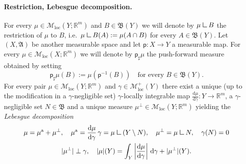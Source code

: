 \documentclass[11pt,reqno]{amsart}
\numberwithin{equation}{section}
\newcommand{\R}{\mathbb{R}}
\newcommand{\dd}{\mathrm{d}}
\theoremstyle{definition}
\def\dd{\mathrm{d}}
\newcommand{\sfp}{\mathsf{p}}
\newcommand{\mres}{\kern1pt\mathbin{\vrule height 1.6ex depth 0pt width
    0.13ex\vrule height 0.13ex depth 0pt width 1.3ex}}
\newcommand{\frB}{\mathfrak B}
\newcommand{\Mloc}{\mathcal{M}_{\mathrm{loc}}}
\numberwithin{equation}{section}
\begin{document}
 \paragraph{\bf Restriction, Lebesgue decomposition.} For every $\mu\in \Mloc(Y;\R^m)$ and $B\in \frB(Y)$
 we will denote by $\mu\mres B$ the restriction of $\mu$ to $B$, i.e.\ 
 $\mu\mres B(A):=\mu(A\cap B)$ for every $A\in \frB(Y)$.
 Let $(X,\mathfrak A)$ be another measurable space and let $\sfp:X\to
 Y$
 a measurable map. 
 For every $\mu\in \Mloc(X;\R^m)$ we will denote by
 $\sfp_\sharp\mu$ the push-forward measure obtained by setting
 \begin{equation}
   \label{eq:82}
   \sfp_\sharp\mu(B):=\mu(\sfp^{-1}(B))\quad\text{for every }B\in \frB(Y).
 \end{equation}
 For every pair $\mu\in \Mloc(Y;\R^m)$ and $\gamma\in \Mloc^+(Y)$
 there exist a unique (up to the modification
 in a $\gamma$-negligible set) $\gamma$-locally integrable map
 $\frac{\dd\mu}{\dd\gamma}:
 Y\to\R^m$, a $\gamma$-negligible set $N\in \frB$
 and a unique measure $\mu^\perp\in \Mloc(Y;\R^m)$
 yielding the \emph{Lebesgue decomposition}
 \begin{equation}
   \label{eq:Leb}
   \begin{gathered}
     \mu=\mu^{\mathrm{a}}+\mu^\perp,\quad \mu^{\mathrm{a}}=\frac{\dd\mu}{\dd\gamma}\,\gamma=
     \mu\mres(Y\setminus N),\quad \mu^\perp=\mu\mres N,\quad
     \gamma(N)=0\\
     |\mu^\perp|\perp \gamma,\quad |\mu|(Y)=\int_Y
     \left|\frac{\dd \mu}{\dd\gamma}\right|\,\dd\gamma+|\mu^\perp|(Y).
   \end{gathered}
 \end{equation}
\end{document}
